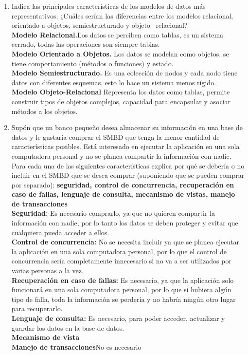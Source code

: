 \documentclass[12pt]{article}
\begin{document}
\begin{enumerate}
\begin{itemize}
	  \end{itemize}

      \item Indica las principales características de los modelos de
      datos más representativos. ¿Cuáles serían las diferencias
      entre los  modelos relacional, orientado a objetos,
      semiestructurado y objeto –relacional?\\
      \textbf{Modelo Relacional.}Los datos se perciben como tablas,
      es un sistema cerrado, todas las operaciones son siempre tablas.\\
      \textbf{Modelo Orientado a Objetos.} Los datos se modelan como
      objetos, se tiene comportamiento (métodos o funciones) y estado.\\
      \textbf{Modelo Semiestructurado.} Es una colección de nodos y
      cada nodo tiene datos con diferentes esquemas, esto lo hace un
      sistema menos rígido.\\
      \textbf{Modelo Objeto-Relacional} Representa los datos como tablas,
      permite construir tipos de objetos complejos, capacidad para
      encapsular y asociar métodos a los objetos.

      \item Supón  que  un banco pequeño desea  almacenar  su
      información  en una  base  de  datos  y  le gustaría comprar
      el SMBD que  tenga  la  menor  cantidad  de  características
      posibles. Está interesado en ejecutar la aplicación en una sola computadora personal y no se planea compartir la
      información  con  nadie.  Para  cada  una  de  las
      siguientes  características  explica  por  qué  se debería o
      no incluir en el SMBD que se desea comprar (suponiendo que se
      pueden comprar por separado): \textbf{seguridad, control de
      concurrencia, recuperación en caso de fallas, lenguaje de
      consulta, mecanismo de vistas, manejo de transacciones}\\
      \textbf{Seguridad:} Es necesario comprarlo, ya que no quieren
      compartir la información con nadie, por lo tanto los datos
      se deben proteger y evitar que cualquiera pueda acceder a
      ellos.\\
      \textbf{Control de concurrencia:} No se necesita incluir ya que
      se planea ejecutar la aplicación en una sola computadora
      personal, por lo que el control de concurrencia sería
      completamente innecesario si no va a ser utilizados por varias
      personas a la vez.\\
      \textbf{Recuperación en caso de fallas:} Es necesario, ya que
      la aplicación solo funcionará en una sola computadora personal,
      por lo que si hubiera algún tipo de falla, toda la información
      se perdería y no habría ningún otro lugar para recuperarlo.\\
      \textbf{Lenguaje de consulta:} Es necesario, para poder acceder,
      actualizar y guardar los datos en la base de datos.\\
      \textbf{Mecanismo de vista}\\
      \textbf{Manejo de transacciones}No es necesario\\




\end{enumerate}
\end{document}
